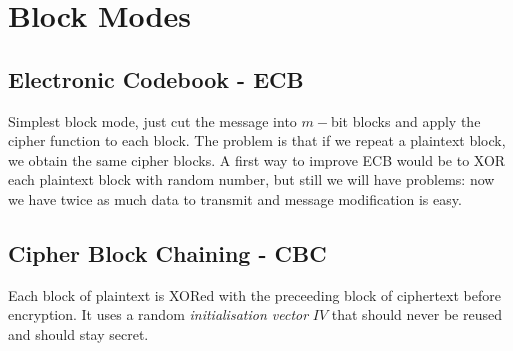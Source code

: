\section{Block Modes}
\subsection{Electronic Codebook - ECB}
\begin{figure}
\vspace{-20pt}
\end{figure}
Simplest block mode, just cut the message into $m-$bit blocks and apply the cipher function to each block. 
The problem is that if we repeat a plaintext block, we obtain the same cipher blocks. A first way to improve ECB would be to XOR each plaintext block with random number, but still we will have problems: now we have twice as much data to transmit and message modification is easy.

\subsection{Cipher Block Chaining - CBC}
\begin{figure}
\vspace{-50pt}
\end{figure}
Each block of plaintext is XORed with the preceeding block of ciphertext before encryption. It uses a random \textit{initialisation vector} $IV$ that should never be reused and should stay secret.


